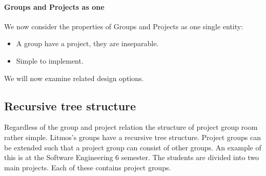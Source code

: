 \paragraph{Groups and Projects as one} We now consider the properties of Groups and Projects as one single entity:
\begin{itemize}
	\item A group have a project, they are inseparable.
	\item Simple to implement.
\end{itemize}


We will now examine related design options.

\subsection{Recursive tree structure}
Regardless of the group and project relation the structure of project group room rather simple. 
Litmos's groups have a recursive tree structure. Project groups can be extended such that a project group can consist of other groups. An example of this is at the Software Engineering 6\nth{} semester. The students are divided into two main projects. Each of these contains project groups. 








